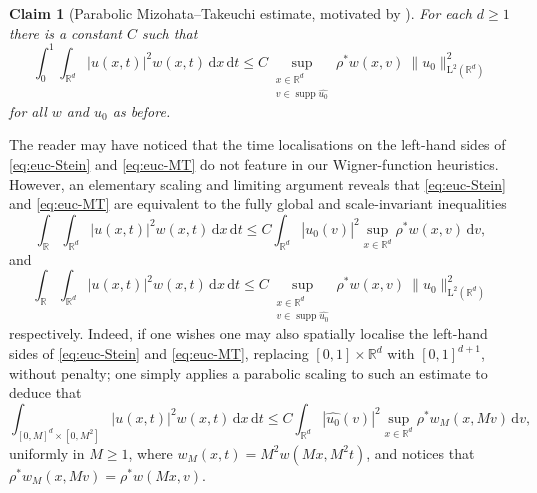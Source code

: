 \documentclass[11pt,reqno]{amsart}
\newtheorem*{claim}{Claim}
\numberwithin{equation}{section}
\newcommand{\supp}{\operatorname{supp}}
\newcommand{\dd}{\,\mathrm{d}}
\renewcommand{\leq}{\leqslant}
\renewcommand{\le}{\leqslant}
\renewcommand{\geq}{\geqslant}
\begin{document}
\begin{claim}[{Parabolic Mizohata--Takeuchi estimate, motivated by \cite{Tak74,Tak80,Miz85,BRV}}]
For each $d\geq1$ there is a constant $C$ such that
\begin{equation}\label{eq:euc-MT}
\int_0^1\int_{\mathbb{R}^d}|u(x,t)|^2w(x,t)\dd x\dd t
\le C\sup_{\substack{x\in\mathbb{R}^d\\ v\in\supp\widehat{u_0}}}\!\!\!\!\rho^{\ast}w(x,v)\ \|u_0\|_{\mathrm{L}^2(\mathbb{R}^d)}^2
\end{equation}
for all $w$ and $u_0$ as before. 
\end{claim}
The reader may have noticed that the time localisations on the left-hand sides of \eqref{eq:euc-Stein} and \eqref{eq:euc-MT} do not feature in our Wigner-function heuristics. However, an elementary scaling and limiting argument reveals that \eqref{eq:euc-Stein} and \eqref{eq:euc-MT} are equivalent to the fully global and scale-invariant inequalities
\begin{equation}\label{eq:euc-Stein-glo}
\int_{\mathbb{R}}\int_{\mathbb{R}^d}|u(x,t)|^2w(x,t)\dd x\dd t
\le C\int_{\mathbb{R}^d}|\widehat{u_0}(v)|^2\sup_{x\in\mathbb{R}^d}\rho^{\ast}w(x,v)\dd v,
\end{equation}
and 
\begin{equation}\label{eq:euc-MT-glo}
\int_{\mathbb{R}}\int_{\mathbb{R}^d}|u(x,t)|^2w(x,t)\dd x\dd t
\le C\sup_{\substack{x\in\mathbb{R}^d\\ v\in\supp\widehat{u_0}}}\!\!\!\!\rho^{\ast}w(x,v)\ \|u_0\|_{\mathrm{L}^2(\mathbb{R}^d)}^2
\end{equation}
respectively.
Indeed, if one wishes one may also spatially localise the left-hand sides of \eqref{eq:euc-Stein} and \eqref{eq:euc-MT}, replacing $[0,1]\times\mathbb{R}^d$ with $[0,1]^{d+1}$, without penalty; one simply applies a parabolic scaling to such an estimate to deduce that
\[ \int_{[0,M]^{d}\times [0,M^2]}|u(x,t)|^2w(x,t)\dd x\dd t\leq C\int_{\mathbb{R}^d}|\widehat{u_0}(v)|^2\sup_{x\in\mathbb{R}^d}\rho^{\ast}w_M(x,Mv)\dd v, \]
uniformly in $M\geq 1$, where $w_M(x,t)=M^2w(Mx,M^2t)$, and notices that $\rho^{\ast}w_M(x,Mv)=\rho^{\ast}w(Mx,v)$.
\end{document}
